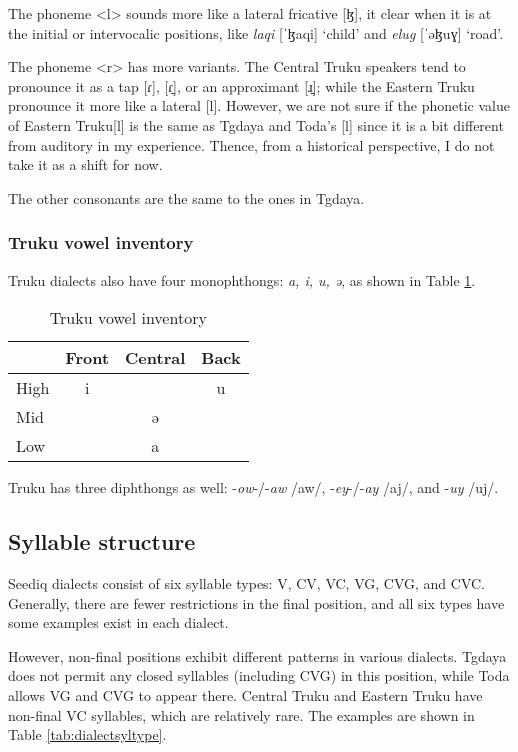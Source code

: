 \documentclass[12pt]{article}
\newcommand{\stgf}{Tgdaya\xspace}
\newcommand{\stof}{Toda\xspace}
\newcommand{\sctrf}{Central Truku\xspace}
\newcommand{\setrf}{Eastern Truku\xspace}
\begin{document}
The phoneme <l> sounds more like a lateral fricative [ɮ], it clear when it is at the initial or intervocalic positions, like \textit{laqi} [ˈɮaqi] `child' and \textit{elug} [ˈəɮuɣ] `road'. 

The phoneme <r> has more variants. The \sctrf speakers tend to pronounce it as a tap [ɾ], [ɾ̠], or an approximant [ɹ̠]; while the \setrf pronounce it more like a lateral [l]. However, we are not sure if the phonetic value of \setrf [l] is the same as \stgf and \stof's [l] since it is a bit different from auditory in my experience. Thence, from a historical perspective, I do not take it as a shift for now.

The other consonants are the same to the ones in \stgf. 

\subsubsection{Truku vowel inventory}

Truku dialects also have four monophthongs: \textit{a, i, u, ə}, as shown in Table \ref{tab:trV}.

\begin{table}[!htbp]
\centering
\caption{Truku vowel inventory}
\label{tab:trV}
\begin{tabular}{lccc}
\hline
     & Front & Central & Back \\ \hline
High &  i    &         &  u   \\
Mid  &       &  ə      &      \\
Low  &       &  a      &      \\ \hline
\end{tabular}
\end{table}

Truku has three diphthongs as well: -\textit{ow}-/-\textit{aw} /aw/, -\textit{ey}-/-\textit{ay} /aj/, and -\textit{uy} /uj/.

\subsection{Syllable structure}

Seediq dialects consist of six syllable types: V, CV, VC, VG, CVG, and CVC. Generally, there are fewer restrictions in the final position, and all six types have some examples exist in each dialect.

However, non-final positions exhibit different patterns in various dialects. \stgf does not permit any closed syllables (including CVG) in this position, while \stof allows VG and CVG to appear there. \sctrf and \setrf have non-final VC syllables, which are relatively rare. The examples are shown in Table \ref{tab:dialectsyltype}.
\end{document}
